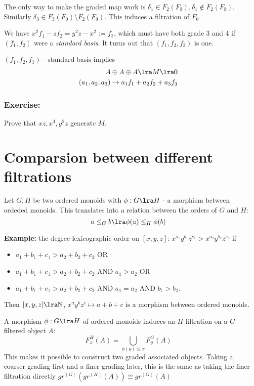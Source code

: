 The only way to make the graded map work is 
$\delta_1 \in F_2(F_0), \delta_1\not\in F_2(F_0)$.
Similarly $\delta_3 \in F_3(F_0) \setminus F_2(F_0)$.
This induces a filtration of $F_0$.

We have $x^2f_1 - zf_2 = y^2z - x^2 := f_3$,
which must have both grade $3$ and $4$ if 
$(f_1, f_2)$ were a \textit{standard basis}.
It turns out that 
$(f_1, f_2, f_3)$ is  one.

$(f_1, f_2, f_3)$ - standard basis implies
\begin{eqnarray*}
A\oplus A\oplus A \lra M \lra 0\\
(a_1, a_2, a_3) \mapsto a_1 f_1 + a_2 f_2 + a_3 f_3
\end{eqnarray*}

\subsubsection{Exercise:}
Prove that $xz, x^3, y^2z$ generate $M$.

\section{Comparsion between different filtrations}
Let $G, H$ be two ordered monoids with
$\phi: G\lra H$ - a morphism between ordeded monoids.
This translates into a relation between the orders
of $G$ and $H$:
\[
    a \leq_G b \lra \phi(a) \leq_H \phi(b)
\]

\textbf{Example:} the degree lexicographic order
on $[x, y, z]$: 
$x^{a_1}y^{b_1}z^{c_1} > x^{a_2}y^{b_2}z^{c_2}$
if 
\begin{itemize}
\item $a_1 + b_1 + c_1 > a_2 + b_2 + c_2$ OR
\item $a_1 + b_1 + c_1 > a_2 + b_2 + c_2$ AND 
    $a_1 > a_2$ OR
\item $a_1 + b_1 + c_1 > a_2 + b_2 + c_2$ AND 
    $a_1 = a_2$ AND $ b_1 > b_2$.
\end{itemize}
Then  $[x,y,z] \lra \mathbb{N}$,
    $x^ay^bz^c \mapsto a+b+c$ is a morphism
    between ordered monoids.

A morphism $\phi : G\lra H$ of ordered monoids
induces an $H$-filtration on a $G$-filtered
object $A$:
\[
F_x^H(A) = \bigcup_{\phi(y) \leq x} F_y^G(A)
\]
This makes it possible to construct two graded associated
objects. 
Taking a coarser grading first and a finer
grading later, this is the same 
as taking the finer filtration directly
$gr^{(G)}\left( 
    gr^{(H)}(A)
\right) \cong gr^{(G)}(A)$ 
